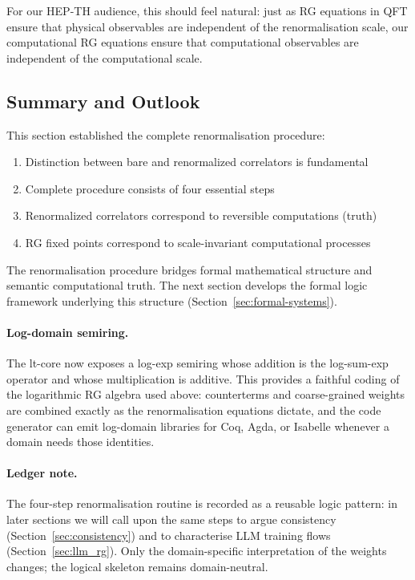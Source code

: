 For our HEP-TH audience, this should feel natural: just as RG equations in QFT ensure that physical observables are independent of the renormalisation scale, our computational RG equations ensure that computational observables are independent of the computational scale.

\subsection{Summary and Outlook}

This section established the complete renormalisation procedure:

\begin{enumerate}
\item Distinction between bare and renormalized correlators is fundamental
\item Complete procedure consists of four essential steps
\item Renormalized correlators correspond to reversible computations (truth)
\item RG fixed points correspond to scale-invariant computational processes
\end{enumerate}

The renormalisation procedure bridges formal mathematical structure and semantic computational truth. The next section develops the formal logic framework underlying this structure (Section~\ref{sec:formal-systems}).

\paragraph{Log-domain semiring.} The lt-core now exposes a log-exp semiring whose addition is the log-sum-exp operator and whose multiplication is additive. This provides a faithful coding of the logarithmic RG algebra used above: counterterms and coarse-grained weights are combined exactly as the renormalisation equations dictate, and the code generator can emit log-domain libraries for Coq, Agda, or Isabelle whenever a domain needs those identities.

\paragraph{Ledger note.} The four-step renormalisation routine is recorded as a reusable logic pattern: in later sections we will call upon the same steps to argue consistency (Section~\ref{sec:consistency}) and to characterise LLM training flows (Section~\ref{sec:llm_rg}). Only the domain-specific interpretation of the weights changes; the logical skeleton remains domain-neutral.
